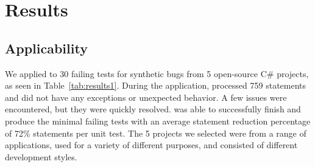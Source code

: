 \clearpage %

\chapter{Results}\label{CH6_Results}

\section{Applicability}
We applied \mytool to 30 failing tests for synthetic bugs from 5 open-source C\# projects, as seen in Table~\ref{tab:results1}. During the application, \mytool processed 759 statements and did not have any exceptions or unexpected behavior. A few issues were encountered, but they were quickly resolved. \mytool was able to successfully finish and produce the minimal failing tests with an average statement reduction percentage of 72\% statements per unit test. The 5 projects we selected were from a range of applications, used for a variety of different purposes, and consisted of different development styles. 

